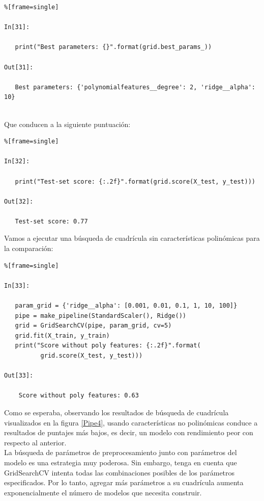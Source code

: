 	
	\begin{lstlisting}%[frame=single]
	
In[31]:
	
   print("Best parameters: {}".format(grid.best_params_))
	
Out[31]:
	
   Best parameters: {'polynomialfeatures__degree': 2, 'ridge__alpha': 10}
	
	\end{lstlisting}
	
	Que conducen a la siguiente puntuación:
	
	
	
	\begin{lstlisting}%[frame=single]
	
In[32]:
	
   print("Test-set score: {:.2f}".format(grid.score(X_test, y_test)))
	
Out[32]:
	
   Test-set score: 0.77	
	\end{lstlisting}
	
	Vamos a ejecutar una búsqueda de cuadrícula sin características polinómicas para la comparación:
	
	
	
	\begin{lstlisting}%[frame=single]
	
In[33]:
	
   param_grid = {'ridge__alpha': [0.001, 0.01, 0.1, 1, 10, 100]}
   pipe = make_pipeline(StandardScaler(), Ridge())
   grid = GridSearchCV(pipe, param_grid, cv=5)
   grid.fit(X_train, y_train)
   print("Score without poly features: {:.2f}".format(
          grid.score(X_test, y_test)))
   
Out[33]:
   
	Score without poly features: 0.63
  \end{lstlisting}
 	
	
	Como se  esperaba, observando los resultados de búsqueda de cuadrícula visualizados en la figura \ref{Pipe4}, usando características no polinómicas conduce a resultados de puntajes más bajos, es decir, un modelo con rendimiento peor con respecto al anterior.\\
	
	La búsqueda de parámetros de preprocesamiento junto con parámetros del modelo 
	es una estrategia muy poderosa. Sin embargo, tenga en cuenta que  {\ttfamily GridSearchCV }  
	intenta todas las combinaciones posibles de los parámetros especificados. Por lo tanto,
	agregar más parámetros a su cuadrícula aumenta exponencialmente el número de modelos que
	necesita construir.
	
